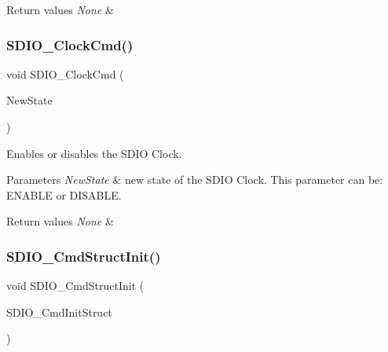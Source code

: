 \begin{DoxyRetVals}{Return values}
{\em None} & \\
\hline
\end{DoxyRetVals}
\mbox{\label{group___s_d_i_o___private___functions_ga7243b857d6b323748ff3a493b265bedc}} 
\subsubsection{\texorpdfstring{SDIO\_ClockCmd()}{SDIO\_ClockCmd()}}
{\footnotesize\ttfamily void S\+D\+I\+O\+\_\+\+Clock\+Cmd (\begin{DoxyParamCaption}\item[{\mbox{\hyperlink{group___exported__types_gac9a7e9a35d2513ec15c3b537aaa4fba1}{Functional\+State}}}]{New\+State }\end{DoxyParamCaption})}



Enables or disables the S\+D\+IO Clock. 


\begin{DoxyParams}{Parameters}
{\em New\+State} & new state of the S\+D\+IO Clock. This parameter can be\+: E\+N\+A\+B\+LE or D\+I\+S\+A\+B\+LE. \\
\hline
\end{DoxyParams}

\begin{DoxyRetVals}{Return values}
{\em None} & \\
\hline
\end{DoxyRetVals}
\mbox{\label{group___s_d_i_o___private___functions_ga09d9e89f49c87c82aec79c97b7068e24}} 
\subsubsection{\texorpdfstring{SDIO\_CmdStructInit()}{SDIO\_CmdStructInit()}}
{\footnotesize\ttfamily void S\+D\+I\+O\+\_\+\+Cmd\+Struct\+Init (\begin{DoxyParamCaption}\item[{\mbox{\hyperlink{struct_s_d_i_o___cmd_init_type_def}{S\+D\+I\+O\+\_\+\+Cmd\+Init\+Type\+Def}} $\ast$}]{S\+D\+I\+O\+\_\+\+Cmd\+Init\+Struct }\end{DoxyParamCaption})}



